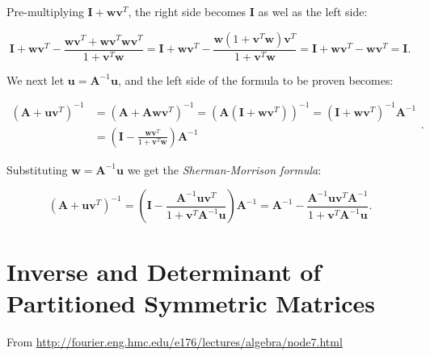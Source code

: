 \documentclass[10pt,b5paper,titlepage]{book}
\begin{document}
Pre-multiplying $\mathbf{I} + \mathbf{w}\mathbf{v}^{T}$, the right side becomes
$\mathbf{I}$ as wel as the left side:

\begin{equation}
    \mathbf{I} + \mathbf{w}\mathbf{v}^{T}
    - \frac{\mathbf{w}\mathbf{v}^{T} + \mathbf{w}\mathbf{v}^{T}\mathbf{w}\mathbf{v}^{T}}
    {1 + \mathbf{v}^{T}\mathbf{w}}
    = \mathbf{I} + \mathbf{w}\mathbf{v}^{T}
    - \frac{\mathbf{w}(1 + \mathbf{v}^{T}\mathbf{w})\mathbf{v}^{T}}
    {1 + \mathbf{v}^{T}\mathbf{w}}
    = \mathbf{I} + \mathbf{w}\mathbf{v}^{T} - \mathbf{w}\mathbf{v}^{T} = \mathbf{I}
.\end{equation}

We next let $\mathbf{u} = \mathbf{A}^{-1}\mathbf{u}$, and the left side of the
formula to be proven becomes:

\begin{equation}
    \begin{array}{ll}
        (\mathbf{A}+\mathbf{u}\mathbf{v}^{T})^{-1}
        &= (\mathbf{A} + \mathbf{A}\mathbf{w}\mathbf{v}^{T})^{-1}
        = (\mathbf{A}(\mathbf{I}+\mathbf{w}\mathbf{v}^{T}))^{-1}
        = (\mathbf{I}+\mathbf{w}\mathbf{v}^{T})^{-1}\mathbf{A}^{-1}\\
        &= \left( \mathbf{I}
        - \frac{\mathbf{w}\mathbf{v}^{T}}{1+\mathbf{v}^{T}\mathbf{w}}\right) \mathbf{A}^{-1}
    \end{array}
.\end{equation}

Substituting $\mathbf{w} = \mathbf{A}^{-1}\mathbf{u}$ we get the
\textit{Sherman-Morrison formula}:

\begin{equation}
    (\mathbf{A}+\mathbf{u}\mathbf{v}^{T})^{-1}
    = \left( \mathbf{I}
    - \frac{\mathbf{A}^{-1}\mathbf{u}\mathbf{v}^{T}}
    {1+\mathbf{v}^{T}\mathbf{A}^{-1}\mathbf{u}} \right) \mathbf{A}^{-1}
    = \mathbf{A}^{-1}
    - \frac{\mathbf{A}^{-1}\mathbf{u}\mathbf{v}^{T}\mathbf{A}^{-1}}
    {1 + \mathbf{v}^{T}\mathbf{A}^{-1}\mathbf{u}}
.\end{equation}







\chapter{Inverse and Determinant of Partitioned Symmetric Matrices}
From \url{http://fourier.eng.hmc.edu/e176/lectures/algebra/node7.html}\\
\end{document}
